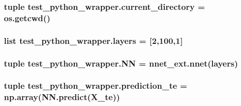 \subsubsection[{current\+\_\+directory}]{\setlength{\rightskip}{0pt plus 5cm}tuple test\+\_\+python\+\_\+wrapper.\+current\+\_\+directory = os.\+getcwd()}\label{namespacetest__python__wrapper_a59fd1bc3247bb0acb40d8cbf871143b9}
\hypertarget{namespacetest__python__wrapper_ac2c345805c1880bb41413973e3f408d6}{}
\subsubsection[{layers}]{\setlength{\rightskip}{0pt plus 5cm}list test\+\_\+python\+\_\+wrapper.\+layers = \mbox{[}2,100,1\mbox{]}}\label{namespacetest__python__wrapper_ac2c345805c1880bb41413973e3f408d6}
\hypertarget{namespacetest__python__wrapper_acb732ba56f064d73826626b1ebc7db4c}{}
\subsubsection[{N\+N}]{\setlength{\rightskip}{0pt plus 5cm}tuple test\+\_\+python\+\_\+wrapper.\+N\+N = nnet\+\_\+ext.\+nnet({\bf layers})}\label{namespacetest__python__wrapper_acb732ba56f064d73826626b1ebc7db4c}
\hypertarget{namespacetest__python__wrapper_a528e8d70107086ac3d5cae063362b480}{}
\subsubsection[{prediction\+\_\+te}]{\setlength{\rightskip}{0pt plus 5cm}tuple test\+\_\+python\+\_\+wrapper.\+prediction\+\_\+te = np.\+array(N\+N.\+predict(X\+\_\+te))}\label{namespacetest__python__wrapper_a528e8d70107086ac3d5cae063362b480}
\hypertarget{namespacetest__python__wrapper_ac13fec0366a23feb02327f898755f543}{}
